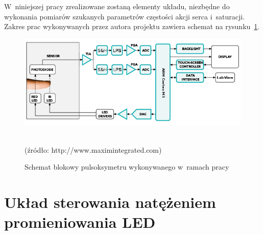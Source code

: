 W~niniejszej pracy zrealizowane zostaną elementy układu, niezbędne do wykonania pomiarów szukanych parametrów częstości akcji serca i~saturacji. Zakres prac wykonywanych przez autora projektu
zawiera schemat na rysunku~\ref{rys:MySchematic}.
\begin{figure}[!h]
	\centerline{\includegraphics[scale = 0.76]{graphic/MySchematic}}
	\caption{Schemat blokowy pulsoksymetru wykonywanego w~ramach pracy}
	~\\
	(źródło: http://www.maximintegrated.com)
	\label{rys:MySchematic}
\end{figure}


\section{Układ sterowania natężeniem promieniowania LED}
\label{sec:LedSterownik}

